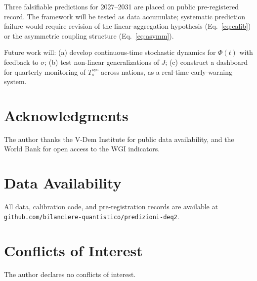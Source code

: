 \documentclass[12pt]{article}
\theoremstyle{plain}
\theoremstyle{definition}
\theoremstyle{remark}
\begin{document}
Three falsifiable predictions for 2027--2031 are placed on public pre-registered record. The framework will be tested as data accumulate; systematic prediction failure would require revision of the linear-aggregation hypothesis (Eq.~\eqref{eq:calib}) or the asymmetric coupling structure (Eq.~\eqref{eq:asymm}).

Future work will: (a) develop continuous-time stochastic dynamics for $\Phi(t)$ with feedback to $\sigma$; (b) test non-linear generalizations of $J$; (c) construct a dashboard for quarterly monitoring of $T_s^{\text{sys}}$ across nations, as a real-time early-warning system.

\section*{Acknowledgments}

The author thanks the V-Dem Institute for public data availability, and the World Bank for open access to the WGI indicators.

\section*{Data Availability}

All data, calibration code, and pre-registration records are available at \texttt{github.com/bilanciere-quantistico/predizioni-deq2}.

\section*{Conflicts of Interest}

The author declares no conflicts of interest.
\end{document}
